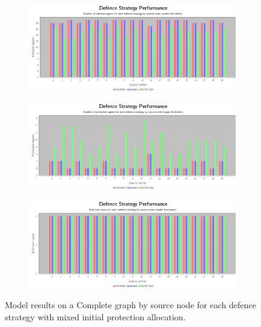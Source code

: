 \documentclass[results.tex]{subfiles}
\begin{document}
\begin{figure}[!ht]
\centering
     \begin{subfigure}[b]{0.9\textwidth}
         \centering
         \includegraphics[width=\textwidth]{Complete/Random/RandomInfectedChart}
         \label{fig:com-ran-infected}
     \end{subfigure}
     \vfill
     \begin{subfigure}[b]{0.9\textwidth}
         \centering
         \includegraphics[width=\textwidth]{Complete/Random/RandomProtectedChart}
         \label{fig:com-ran-protected}
     \end{subfigure}
     \vfill
     \begin{subfigure}[b]{0.9\textwidth}
         \centering
         \includegraphics[width=\textwidth]{Complete/Random/RandomEndTurnChart}
         \label{fig:com-ran-end}
     \end{subfigure}
        \caption{Model results on a Complete graph by source node for each defence strategy with mixed initial protection allocation.}
        \label{fig:com-ran-charts}
\end{figure}
\end{document}
